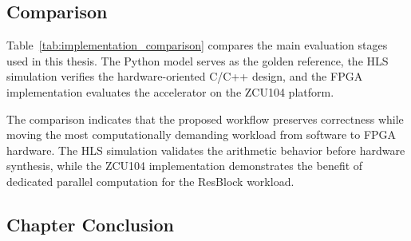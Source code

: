 \subsection{Comparison}

Table~\ref{tab:implementation_comparison} compares the main evaluation stages used in this thesis. The Python model serves as the golden reference, the HLS simulation verifies the hardware-oriented C/C++ design, and the FPGA implementation evaluates the accelerator on the ZCU104 platform.

\begin{table}[H]
    \centering
    \caption{Comparison between software reference, HLS simulation, and FPGA implementation}
    \label{tab:implementation_comparison}
\end{table}

The comparison indicates that the proposed workflow preserves correctness while moving the most computationally demanding workload from software to FPGA hardware. The HLS simulation validates the arithmetic behavior before hardware synthesis, while the ZCU104 implementation demonstrates the benefit of dedicated parallel computation for the ResBlock workload.

\subsection{Chapter Conclusion}

